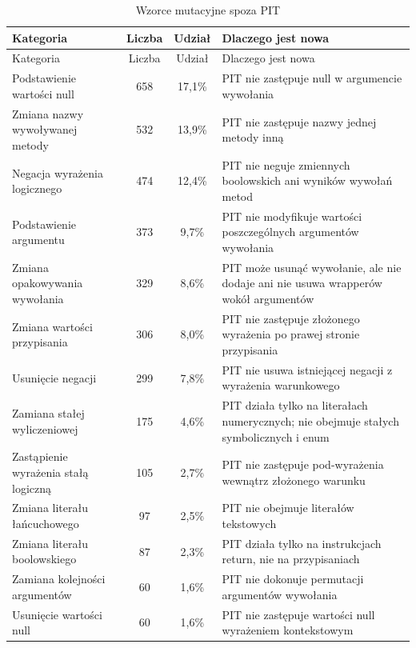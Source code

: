 \documentclass[12pt,a4paper,oldfontcommands]{memoir}
\theoremstyle{plain}
\theoremstyle{definition}
\theoremstyle{remark}
\begin{document}
    \begin{footnotesize}
        \begin{longtable}{|p{4.2cm}|c|c|p{7cm}|}
            \caption{Wzorce mutacyjne spoza PIT}\label{tab:spoza_pit}\\
            \hline
            Kategoria & Liczba & Udział & Dlaczego jest nowa \\ \hline
            \endfirsthead
            \hline
            Kategoria & Liczba & Udział & Dlaczego jest nowa \\ \hline
            \endhead
            Podstawienie wartości null & 658 & 17,1\% & PIT nie zastępuje null w argumencie wywołania \\ \hline
            Zmiana nazwy wywoływanej metody & 532 & 13,9\% & PIT nie zastępuje nazwy jednej metody inną \\ \hline
            Negacja wyrażenia logicznego & 474 & 12,4\% & PIT nie neguje zmiennych boolowskich ani wyników wywołań metod \\ \hline
            Podstawienie argumentu & 373 & 9,7\% & PIT nie modyfikuje wartości poszczególnych argumentów wywołania \\ \hline
            Zmiana opakowywania wywołania & 329 & 8,6\% & PIT może usunąć wywołanie, ale nie dodaje ani nie usuwa wrapperów wokół argumentów \\ \hline
            Zmiana wartości przypisania & 306 & 8,0\% & PIT nie zastępuje złożonego wyrażenia po prawej stronie przypisania \\ \hline
            Usunięcie negacji & 299 & 7,8\% & PIT nie usuwa istniejącej negacji z wyrażenia warunkowego \\ \hline
            Zamiana stałej wyliczeniowej & 175 & 4,6\% & PIT działa tylko na literałach numerycznych; nie obejmuje stałych symbolicznych i enum \\ \hline
            Zastąpienie wyrażenia stałą logiczną & 105 & 2,7\% & PIT nie zastępuje pod-wyrażenia wewnątrz złożonego warunku \\ \hline
            Zmiana literału łańcuchowego & 97 & 2,5\% & PIT nie obejmuje literałów tekstowych \\ \hline
            Zmiana literału boolowskiego & 87 & 2,3\% & PIT działa tylko na instrukcjach return, nie na przypisaniach \\ \hline
            Zamiana kolejności argumentów & 60 & 1,6\% & PIT nie dokonuje permutacji argumentów wywołania \\ \hline
            Usunięcie wartości null & 60 & 1,6\% & PIT nie zastępuje wartości null wyrażeniem kontekstowym \\ \hline

\end{longtable}
\end{footnotesize}
\end{document}

